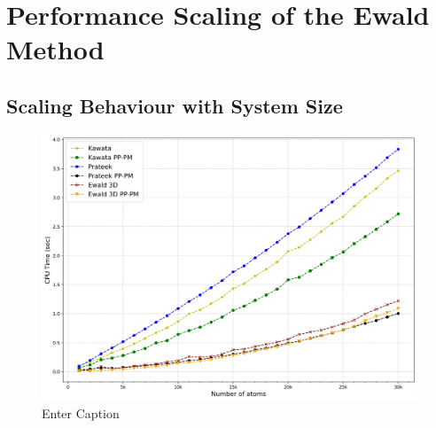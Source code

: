 \section{Performance Scaling of the Ewald Method}
\subsection{Scaling Behaviour with System Size}
\begin{figure}[H]
    \centering
    \includegraphics[width=\linewidth]{images/Result30k.jpg}
    \caption{Enter Caption}
    \label{fig:enter-label}
\end{figure}
